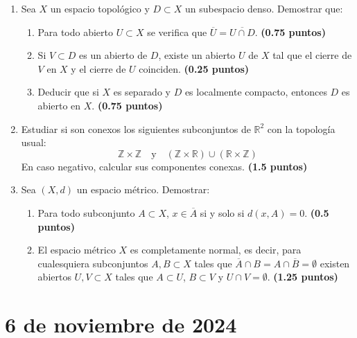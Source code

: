 \begin{enumerate}
    \item Sea $X$ un espacio topológico y $D \subset X$ un subespacio denso. Demostrar que:
    \begin{enumerate}
        \item Para todo abierto $U \subset X$ se verifica que $\overline{U} = \overline{U \cap D}$.
        \hfill \textbf{(0.75 puntos)}
        \item Si $V \subset D$ es un abierto de $D$, existe un abierto $U$ de $X$ tal que el cierre de $V$ en $X$ y el cierre de $U$ coinciden.
        \hfill \textbf{(0.25 puntos)}
        \item Deducir que si $X$ es separado y $D$ es localmente compacto, entonces $D$ es abierto en $X$.
        \hfill \textbf{(0.75 puntos)}
    \end{enumerate}

    \item Estudiar si son conexos los siguientes subconjuntos de $\mathbb{R}^2$ con la topología usual:
    \[
        \mathbb{Z} \times \mathbb{Z} \quad \text{y} \quad (\mathbb{Z} \times \mathbb{R}) \cup (\mathbb{R} \times \mathbb{Z})
    \]
    En caso negativo, calcular sus componentes conexas.
    \hfill \textbf{(1.5 puntos)}

    \item Sea $(X, d)$ un espacio métrico. Demostrar:
    \begin{enumerate}
        \item Para todo subconjunto $A \subset X$, $x \in \overline{A}$ si y solo si $d(x, A) = 0$.
        \hfill \textbf{(0.5 puntos)}
        \item El espacio métrico $X$ es completamente normal, es decir, para cualesquiera subconjuntos $A, B \subset X$ tales que $\overline{A} \cap B = A \cap \overline{B} = \emptyset$ existen abiertos $U, V \subset X$ tales que $A \subset U$, $B \subset V$ y $U \cap V = \emptyset$.
        \hfill \textbf{(1.25 puntos)}
    \end{enumerate}
\end{enumerate}

\newpage

\section{6 de noviembre de 2024}

